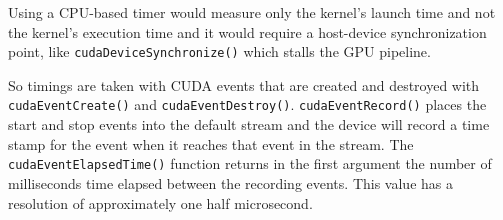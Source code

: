 Using a CPU-based timer would measure only the kernel's launch time and not the kernel's execution time and it would require a host-device synchronization point, like \texttt{cudaDeviceSynchronize()} which stalls the GPU pipeline.

So timings are taken with CUDA events that are created and destroyed with \texttt{cudaEventCreate()} and \texttt{cudaEventDestroy()}. \texttt{cudaEventRecord()} places the start and stop events into the default stream  and the device will record a time stamp for the event when it reaches that event in the stream. 
The \texttt{cudaEventElapsedTime()} function returns in the first argument the number of milliseconds time elapsed between the recording events. This value has a resolution of approximately one half microsecond.







